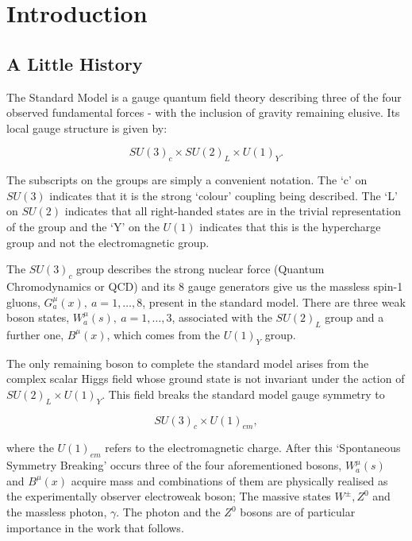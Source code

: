 
\chapter{Introduction}

	\label{chap:intro}

\section{A Little History}
	\label{sec:history}

	The Standard Model is a gauge quantum field theory describing three of the four observed
	fundamental forces - with the inclusion of gravity remaining elusive.
	Its local gauge structure is given by:

	\begin{equation}
		SU(3)_c\times SU(2)_L\times U(1)_Y.
		\label{eq:SMGauge}
	\end{equation}

	The subscripts on the groups are simply a convenient notation.  The `c' on $SU(3)$ indicates
	that it is the strong `colour' coupling being described.  The `L' on $SU(2)$ indicates that
	all right-handed states are in the trivial representation of the group and the `Y' on the
	$U(1)$ indicates that this is the hypercharge group and not the electromagnetic group.

	The
	$SU(3)_c$ group describes the strong nuclear force (Quantum Chromodynamics or QCD) and its
	8 gauge generators give us the massless spin-1 gluons, $G_a^\mu(x),\ a=1,\ldots,8$, present
	in the standard model. There are three weak boson states, $W_a^\mu(s),\ a=1,\ldots,3$, associated
	with the $SU(2)_L$ group and a further one, $B^\mu(x)$, which comes from the $U(1)_Y$ group.

	The only remaining boson to complete the standard model arises from the complex scalar Higgs
	field whose ground state is not invariant under the action of $SU(2)_L\times U(1)_Y$. This
	field breaks the standard model gauge symmetry to

	\begin{equation}
		SU(3)_c\times U(1)_{em},
		\label{eq:SMGaugeBroken}
	\end{equation}

	\noindent where the $U(1)_{em}$ refers to the electromagnetic charge.  After this `Spontaneous
	Symmetry Breaking' occurs three of the four aforementioned bosons, $W_a^\mu(s)$ and $B^\mu(x)$
	acquire mass and combinations of them are physically realised as the experimentally observer
	electroweak boson; The massive states $W^\pm, Z^0$ and the massless photon, $\gamma$.
	The photon and the $Z^0$ bosons are of particular importance in the work that follows.

